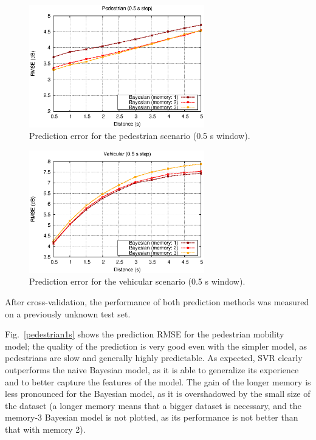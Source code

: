 \documentclass[conference, a4paper]{IEEEtran}
\begin{document}
\begin{figure}[t]
\centering
\includegraphics[width=3in]{./graphics/pedestrian_05s.eps}
\caption{Prediction error for the pedestrian scenario (0.5 s window).}
\label{pedestrian05s}
\end{figure}

\begin{figure}[t]
\centering
\includegraphics[width=3in]{./graphics/vehicular_05s.eps}
\caption{Prediction error for the vehicular scenario (0.5 s window).}
\label{vehicular05s}
\end{figure}



After cross-validation, the performance of both prediction methods was measured on a previously unknown test set.

Fig.~\ref{pedestrian1s} shows the prediction RMSE for the pedestrian mobility model; the quality of the prediction is very good even with the simpler model, as pedestrians are slow and generally highly predictable. As expected, SVR clearly outperforms the naive Bayesian model, as it is able to generalize its experience and to better capture the features of the model. The gain of the longer memory is less pronounced for the Bayesian model, as it is overshadowed by the small size of the dataset (a longer memory means that a bigger dataset is necessary, and the memory-3 Bayesian model is not plotted, as its performance is not better than that with memory 2).
\end{document}
